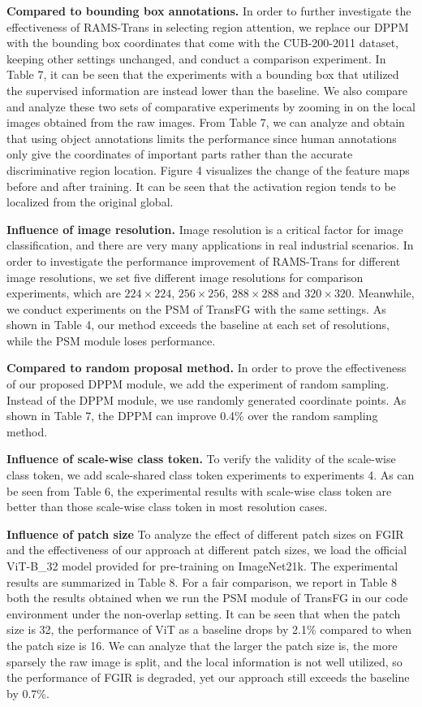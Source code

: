 \documentclass[sigconf]{acmart}
\begin{document}
\textbf{Compared to bounding box annotations.} In order to further investigate the effectiveness of RAMS-Trans in selecting region attention, we replace our DPPM with the bounding box coordinates that come with the CUB-200-2011 dataset, keeping other settings unchanged, and conduct a comparison experiment. In Table 7, it can be seen that the experiments with a bounding box that utilized the supervised information are instead lower than the baseline. We also compare and analyze these two sets of comparative experiments by zooming in on the local images obtained from the raw images. From Table 7, we can analyze and obtain that using object annotations limits the performance since human annotations only give the coordinates of important parts rather than the accurate discriminative region location. Figure 4 visualizes the change of the feature maps before and after training. It can be seen that the activation region tends to be localized from the original global.

\textbf{Influence of image resolution.} Image resolution is a critical factor for image classification, and there are very many applications in real industrial scenarios. In order to investigate the performance improvement of RAMS-Trans for different image resolutions, we set five different image resolutions for comparison experiments, which are $224 \times 224$, $256 \times 256$, $288 \times 288$ and $320 \times 320$. Meanwhile, we conduct experiments on the PSM of TransFG with the same settings. As shown in Table 4, our method exceeds the baseline at each set of resolutions, while the PSM module loses performance.

\textbf{Compared to random proposal method.} In order to prove the effectiveness of our proposed DPPM module, we add the experiment of random sampling. Instead of the DPPM module, we use randomly generated coordinate points. As shown in Table 7, the DPPM can improve 0.4\% over the random sampling method.

\textbf{Influence of scale-wise class token.} To verify the validity of the scale-wise class token, we add scale-shared class token experiments to experiments 4. As can be seen from Table 6, the experimental results with scale-wise class token are better than those scale-wise class token in most resolution cases.

\textbf{Influence of patch size} To analyze the effect of different patch sizes on FGIR and the effectiveness of our approach at different patch sizes, we load the official ViT-B\_32 model provided for pre-training on ImageNet21k. The experimental results are summarized in Table 8. For a fair comparison, we report in Table 8 both the results obtained when we run the PSM module of TransFG in our code environment under the non-overlap setting. It can be seen that when the patch size is 32, the performance of ViT as a baseline drops by 2.1\% compared to when the patch size is 16. We can analyze that the larger the patch size is, the more sparsely the raw image is split, and the local information is not well utilized, so the performance of FGIR is degraded, yet our approach still exceeds the baseline by 0.7\%. 
\end{document}
